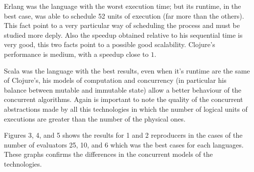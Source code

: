 Erlang was the language with the worst execution time; but its
runtime, in the best case, was able to schedule 52 units of execution
(far more than the others).  This fact point to a very particular way
of scheduling the process and must be studied more deply. Also the
speedup obtained relative to his sequential time is very good, this
two facts point to a possible good scalability. Clojure's performance
is medium, with a speedup close to $1$. 

Scala was the language with the best results, even when it's runtime are the same of Clojure's, his models of computation and concurrency (in particular his balance between mutable and immutable state) allow a better behaviour of the concurrent algorithms. Again is important to note the quality of the concurrent abstractions made by all this technologies in which the number of logical units of executions are greater than the number of the physical ones.

Figures 3, 4, and 5 shows the results for 1 and 2 reproducers in the
cases of the number of evaluators 25, 10, and 6 which was the best
cases for each languages. These graphs confirms the differences in the
concurrent models of the technologies. 
